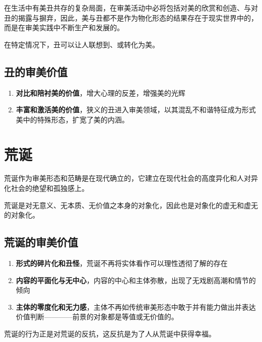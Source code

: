 \documentclass{NoteThesis/note-thesis}
\begin{document}
在生活中有美丑共存的复杂局面，在审美活动中必将包括对美的欣赏和创造、与对丑的揭露与摒弃，因此，美与丑都不是作为物化形态的结果存在于现实世界中的，而是在审美实践中不断生产和发展的。

在特定情况下，丑可以让人联想到、或转化为美。

\subsection{\texorpdfstring{\mbox{}}{} 丑的审美价值}

\begin{enumerate}
    \item \textbf{对比和陪衬美的价值}，增大心理的反差，增强美的光辉
    \item \textbf{丰富和激活美的价值}，狭义的丑进入审美领域，以其混乱不和谐特征成为形式美中的特殊形态，扩宽了美的内涵。
\end{enumerate}

\section{荒诞}

荒诞作为审美形态和范畴是在现代确立的，它建立在现代社会的高度异化和人对异化社会的绝望和孤独感上。

荒诞是对无意义、无本质、无价值之本身的对象化，因此也是对象化的虚无和虚无的对象化。

\subsection{荒诞的审美价值}

\begin{enumerate}
    \item \textbf{形式的碎片化和丑怪}，荒诞不再将实体看作可以理性透彻了解的存在
    \item \textbf{内容的平面化与无中心}，内容的中心和主体弥散，出现了无戏剧高潮和情节的倾向
    \item \textbf{主体的零度化和无力感}，主体不再如传统审美形态中敢于并有能力做出并表达价值判断————前景的对象都是等值或无价值的。
\end{enumerate}

荒诞的行为正是对荒诞的反抗，这反抗是为了人从荒诞中获得幸福。
\end{document}
